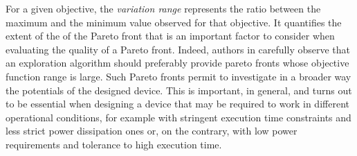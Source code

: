 For a given objective, the \emph{variation range} represents the ratio between the maximum and the minimum value observed for that objective.
It quantifies the extent of the of the Pareto front that is an important factor to consider when evaluating the quality of a Pareto front. Indeed, authors in \cite{zitzler_ec00} carefully observe that an exploration algorithm should preferably provide pareto fronts whose objective function range is large.
Such Pareto fronts permit to investigate in a broader way the potentials of the designed device. This is important, in general, and turns out to be essential when designing a device that may be required to work in different operational conditions, for example with stringent execution time constraints and less strict power dissipation ones or, on the contrary, with low power requirements and tolerance to high execution time.


